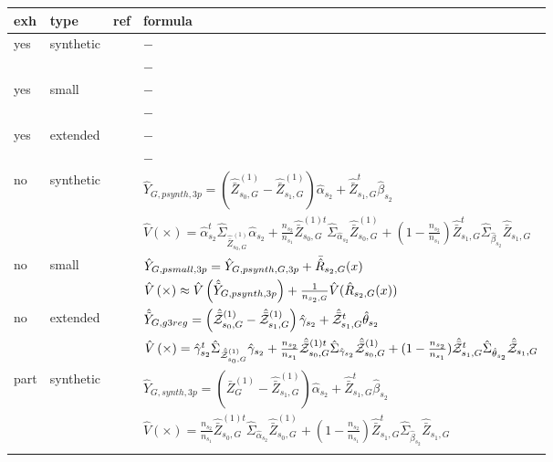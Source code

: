 \begin{table}
    \centering
\begin{tabular}{ l l r l}
	 exh 	&  type	&  ref & formula\\ \toprule
yes & synthetic & & $-$\\
 &  &  & $-$ \\
\lightrule
yes & small &  & $-$\\
 &  &  & $-$\\
\lightrule
yes & extended &  & $-$\\
 &  &  & $-$\\
\strongrule

     no 	&  synthetic 	& \cite[eq. 26b]{hill2017} & $\hat{Y}_{G,psynth,3p} = \left( \hat{\bar{Z}}_{s_0,G}^{(1)}- \hat{\bar{Z}}_{s_1,G}^{(1)}\right) \hat{\alpha}_{s_2} + \hat{\bar{Z}}^t_{s_1,G}\hat{\beta}_{s_2}$\\
        &    	&    \cite[eq. 26d]{hill2017} & $\hat{V}\left(\times\right) = \hat{\alpha}_{s_2}^t \hat{\Sigma}_{\hat{\bar{Z}}_{s_0,G}^{(1)}} \hat{\alpha}_{s_2} + \frac{n_{s_2}}{n_{s_1}} \hat{\bar{Z}}^{(1)t}_{s_0,G} \hat{\Sigma}_{ \hat{\alpha}_{s_2}} \hat{\bar{Z}}^{(1)}_{s_0,G} + (1-\frac{n_{s_2}}{n_{s_1}})\hat{\bar{Z}}^{t}_{s_1,G} \hat{\Sigma}_{ \hat{\beta}_{s_2}} \hat{\bar{Z}}_{s_1,G} $\\
\lightrule
			
     no 	&  small 	& \cite[eq. 22b]{hill2017} & $\hat{Y}_{G,psmall,3p} = \hat{Y}_{G,psynth,G,3p} + \bar{\hat{R}}_{s_2,G}(x)$\\
          &       & \cite[eq. 23b]{hill2017} & $\hat{V}\left(\times\right) \approx \hat{V}\left(\hat{\tilde{Y}}_{G,psynth,3p}\right) + \frac{1}{n_{s_2,G}}\hat{V}(\hat{R}_{s_2,G}(x))$ \\ 

\lightrule
     no 	&  extended 	& \cite[eq. 23]{Man13c} & $\hat{\tilde{Y}}_{G,g3reg} = \left( \hat{\bar{\mathcal{Z}}}_{s_0,G}^{(1)}- \hat{\bar{\mathcal{Z}}}_{s_1,G}^{(1)}\right) \hat{\gamma}_{s_2} + \hat{\bar{\mathcal{Z}}}^t_{s_1,G}\hat{\theta}_{s_2}$\\
        &    	&     \cite[eq. 24]{Man13c} & $\hat{V}\left(\times\right) = \hat{\gamma}_{s_2}^t \hat{\Sigma}_{\hat{\bar{\mathcal{Z}}}_{s_0,G}^{(1)}} \hat{\gamma}_{s_2} + \frac{n_{s_2}}{n_{s_1}} \hat{\bar{\mathcal{Z}}}^{(1)t}_{s_0,G} \hat{\Sigma}_{ \hat{\gamma}_{s_2}} \hat{\bar{\mathcal{Z}}}^{(1)}_{s_0,G} + (1-\frac{n_{s_2}}{n_{s_1}})\hat{\bar{\mathcal{Z}}}^{t}_{s_1,G} \hat{\Sigma}_{ \hat{\theta}_{s_2}} \hat{\bar{\mathcal{Z}}}_{s_1,G} $\\
\strongrule
     part 	&  synthetic 	& \cite[eq. 26a]{hill2017} & $\hat{Y}_{G,synth,3p} = \left( \bar{Z}_{G}^{(1)}- \hat{\bar{Z}}_{s_1,G}^{(1)}\right) \hat{\alpha}_{s_2} + \hat{\bar{Z}}^t_{s_1,G}\hat{\beta}_{s_2}$\\
        &    	&    \cite[eq. 26c]{hill2017} & $\hat{V}\left(\times\right) = \frac{n_{s_2}}{n_{s_1}} \hat{\bar{Z}}^{(1)t}_{s_0,G} \hat{\Sigma}_{ \hat{\alpha}_{s_2}} \hat{\bar{Z}}^{(1)}_{s_0,G} + (1-\frac{n_{s_2}}{n_{s_1}})\hat{\bar{Z}}^{t}_{s_1,G} \hat{\Sigma}_{ \hat{\beta}_{s_2}} \hat{\bar{Z}}_{s_1,G} $\\
\lightrule
			

\end{tabular}
\end{table}
